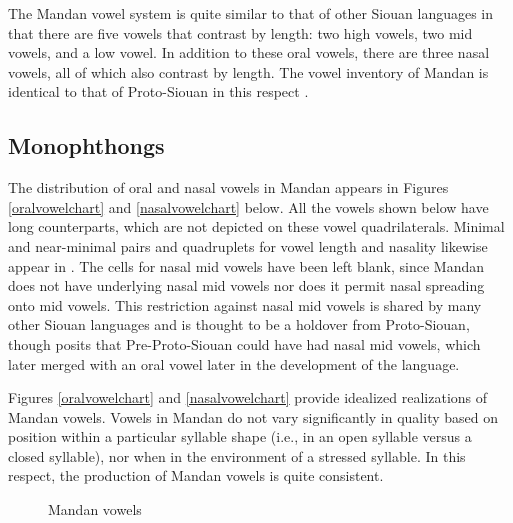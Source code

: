 The Mandan vowel system is quite similar to that of other Siouan languages in that there are five vowels that contrast by length: two high vowels, two mid vowels, and a low vowel. In addition to these oral vowels, there are three nasal vowels, all of which also contrast by length. The vowel inventory of Mandan is identical to that of Proto-Siouan in this respect \citep{rankinetalnd}.

\subsection{Monophthongs}

The distribution of oral and nasal vowels in Mandan appears in Figures \ref{oralvowelchart} and \ref{nasalvowelchart} below. All the vowels shown below have long counterparts, which are not depicted on these vowel quadrilaterals. Minimal and near-minimal pairs and quadruplets for vowel length and nasality likewise appear   in . The cells for nasal mid vowels have been left blank, since Mandan does not have underlying nasal mid vowels nor does it permit nasal spreading onto mid vowels. This restriction against nasal mid vowels is shared by many other Siouan languages and is thought to be a holdover from Proto-Siouan, though \citet[27]{rood1983} posits that Pre-Proto-Siouan could have had nasal mid vowels, which later merged with an oral vowel later in the development of the language.

Figures \ref{oralvowelchart} and \ref{nasalvowelchart} provide idealized realizations of Mandan vowels. Vowels in Mandan do not vary significantly in quality based on position within a particular syllable shape (i.e., in an open syllable versus a closed syllable), nor when in the environment of a stressed syllable. In this respect, the production of Mandan vowels is quite consistent.


\begin{figure}
\caption{Mandan vowels}
\end{figure}





